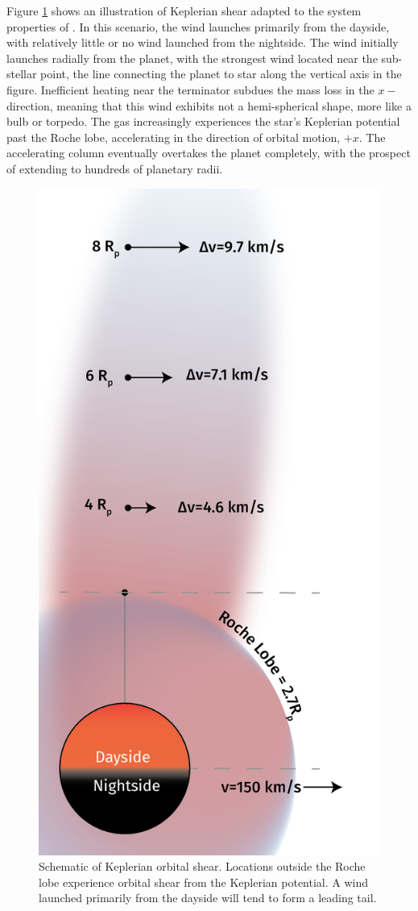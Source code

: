 \documentclass[twocolumn]{aastex631}
\newcommand{\hatpb}{\object{HAT-P-67 b}}
\begin{document}
Figure \ref{fig:KeplerianShear} shows an illustration of Keplerian shear adapted to the system properties of \hatpb.  In this scenario, the wind launches primarily from the dayside, with relatively little or no wind launched from the nightside.  The wind initially launches radially from the planet, with the strongest wind located near the sub-stellar point, the line connecting the planet to star along the vertical axis in the figure.  Inefficient heating near the terminator subdues the mass loss in the $x-$direction, meaning that this wind exhibits not a hemi-spherical shape, more like a bulb or torpedo.  The gas increasingly experiences the star's Keplerian potential past the Roche lobe, accelerating in the direction of orbital motion, $+x$.  The accelerating column eventually overtakes the planet completely, with the prospect of extending to hundreds of planetary radii.

\begin{figure}
    \includegraphics[width=0.8\linewidth]{figures/KeplerianShear_v0p3.png}
    \caption{Schematic of Keplerian orbital shear.  Locations outside the Roche lobe experience orbital shear from the Keplerian potential.  A wind launched primarily from the dayside will tend to form a leading tail.}
    \label{fig:KeplerianShear}
\end{figure}
\end{document}
